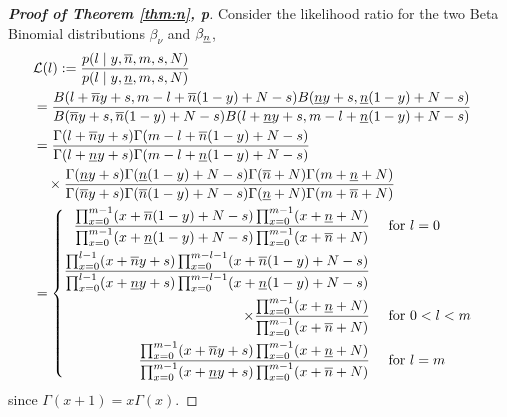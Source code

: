 \documentclass[12pt, a4paper]{elsarticle}
\newtheorem{lemma}[theorem]{Lemma}
\begin{document}

\begin{proof}[\textbf{Proof of Theorem \ref{thm:n}, p\pageref{thm:n}}]
  \label{prf:n}
  Consider the likelihood ratio for the two Beta Binomial distributions $\beta_{\nu}$ and $\beta_{\underline{n}}$,
  \begin{align*}
    \lefteqn{\mathcal{L}(l) := \frac{p(l \mid y, \nu, m, s, N)}{p(l \mid y, \nl, m, s, N)}} \\
    &= \frac{B(l + \nu y + s, m - l + \nu (1 - y) + N - s) B(\nl y + s, \nl (1 - y) + N - s)}
            {B(\nu y + s, \nu (1 - y) + N - s) B(l + \nl y + s, m - l + \nl (1 - y) + N - s)} \\
    &= \frac{\Gamma(l + \nu y + s) \Gamma(m - l + \nu (1 - y) + N - s)}
            {\Gamma(l + \nl y + s) \Gamma(m - l + \nl (1 - y) + N - s)} \\
    &\quad \times \frac{\Gamma(\nl y + s) \Gamma(\nl (1 - y) + N - s) \Gamma(\nu+N) \Gamma(m+\nl+N)}
                       {\Gamma(\nu y + s) \Gamma(\nu (1 - y) + N - s)\Gamma(\nl+N) \Gamma(m+\nu+N)} \\
    &= \left\{ \begin{aligned}
         \frac{\prod_{x=0}^{m-1} (x + \nu (1 - y) + N - s) \prod_{x=0}^{m-1} (x + \nl + N)}
              {\prod_{x=0}^{m-1} (x + \nl (1 - y) + N - s) \prod_{x=0}^{m-1} (x + \nu + N)} &\quad\mbox{ for } l=0 \\
         \frac{\prod_{x=0}^{l-1} (x + \nu y + s) \prod_{x=0}^{m-l-1} (x + \nu (1 - y) + N - s)}
              {\prod_{x=0}^{l-1} (x + \nl y + s) \prod_{x=0}^{m-l-1} (x + \nl (1 - y) + N - s)} \\
         \quad \times \frac{\prod_{x=0}^{m-1} (x + \nl + N)}{\prod_{x=0}^{m-1} (x + \nu + N)} &\quad\mbox{ for } 0<l<m \\
         \frac{\prod_{x=0}^{m-1} (x + \nu y + s) \prod_{x=0}^{m-1} (x + \nl + N)}
              {\prod_{x=0}^{m-1} (x + \nl y + s) \prod_{x=0}^{m-1} (x + \nu + N)} &\quad\mbox{ for } l=m
       \end{aligned} \right.
  \end{align*}
  since $\Gamma(x+1)=x \Gamma(x)$.
  

\end{proof}
\end{document}

